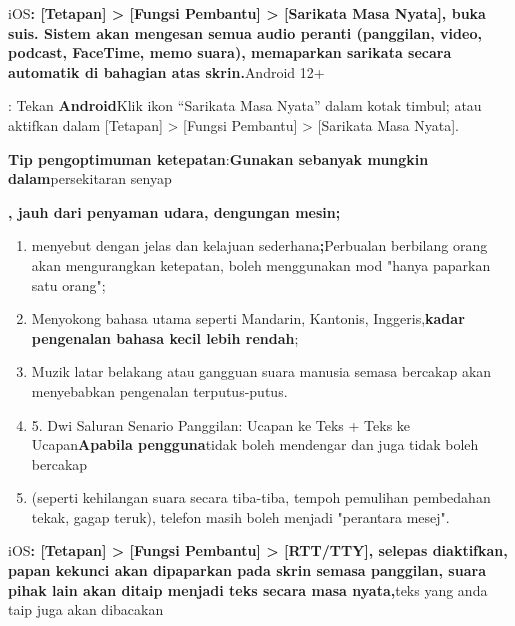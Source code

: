 
iOS\textbf{: [Tetapan] > [Fungsi Pembantu] > [Sarikata Masa Nyata], buka suis. Sistem akan mengesan semua audio peranti (panggilan, video, podcast, FaceTime, memo suara), memaparkan sarikata secara automatik di bahagian atas skrin.}Android 12+

\begin{tcbinfo}{: Tekan}
\textbf{Android}Klik ikon “Sarikata Masa Nyata” dalam kotak timbul; atau aktifkan dalam [Tetapan] > [Fungsi Pembantu] > [Sarikata Masa Nyata].

\textbf{Tip pengoptimuman ketepatan}:\textbf{Gunakan sebanyak mungkin dalam}persekitaran senyap

\textbf{, jauh dari penyaman udara, dengungan mesin;}

\begin{enumerate}
  \item menyebut dengan jelas dan kelajuan sederhana\textbf{;}Perbualan berbilang orang akan mengurangkan ketepatan, boleh menggunakan mod "hanya paparkan satu orang";
  \item Menyokong bahasa utama seperti Mandarin, Kantonis, Inggeris,\textbf{kadar pengenalan bahasa kecil lebih rendah};
  \item Muzik latar belakang atau gangguan suara manusia semasa bercakap akan menyebabkan pengenalan terputus-putus.
  \item 5. Dwi Saluran Senario Panggilan: Ucapan ke Teks + Teks ke Ucapan\textbf{Apabila pengguna}tidak boleh mendengar dan juga tidak boleh bercakap
  \item (seperti kehilangan suara secara tiba-tiba, tempoh pemulihan pembedahan tekak, gagap teruk), telefon masih boleh menjadi "perantara mesej".
\end{enumerate}

\end{tcbinfo}


iOS\textbf{: [Tetapan] > [Fungsi Pembantu] > [RTT/TTY], selepas diaktifkan, papan kekunci akan dipaparkan pada skrin semasa panggilan, suara pihak lain akan ditaip menjadi teks secara masa nyata,}teks yang anda taip juga akan dibacakan


